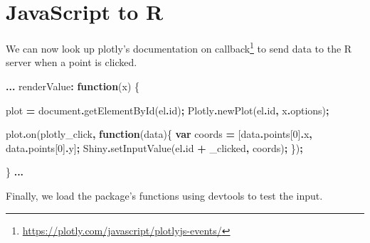 \documentclass[
]{krantz}
\makeatletter
\newenvironment{Shaded}{\begin{snugshade}}{\end{snugshade}}
\newcommand{\AttributeTok}[1]{\textcolor[rgb]{0.61,0.61,0.61}{#1}}
\newcommand{\BuiltInTok}[1]{#1}
\newcommand{\DecValTok}[1]{\textcolor[rgb]{0.06,0.06,0.06}{#1}}
\newcommand{\FunctionTok}[1]{\textcolor[rgb]{0,0,0}{#1}}
\newcommand{\KeywordTok}[1]{\textcolor[rgb]{0.27,0.27,0.27}{\textbf{#1}}}
\newcommand{\NormalTok}[1]{#1}
\newcommand{\OperatorTok}[1]{\textcolor[rgb]{0.43,0.43,0.43}{\textbf{#1}}}
\newcommand{\StringTok}[1]{\textcolor[rgb]{0.5,0.5,0.5}{#1}}
\renewcommand{\href}[2]{#2\footnote{\url{#1}}}
\newenvironment{kframe}{%
\medskip{}
\setlength{\fboxsep}{.8em}
 \def\at@end@of@kframe{}%
 \ifinner\ifhmode%
  \def\at@end@of@kframe{\end{minipage}}%
  \begin{minipage}{\columnwidth}%
 \fi\fi%
 \def\FrameCommand##1{\hskip\@totalleftmargin \hskip-\fboxsep
 \colorbox{shadecolor}{##1}\hskip-\fboxsep
     \hskip-\linewidth \hskip-\@totalleftmargin \hskip\columnwidth}%
 \MakeFramed {\advance\hsize-\width
   \@totalleftmargin\z@ \linewidth\hsize
   \@setminipage}}%
 {\par\unskip\endMakeFramed%
 \at@end@of@kframe}
\renewenvironment{Shaded}{\begin{kframe}}{\end{kframe}}
\makeatother
\begin{document}
\hypertarget{javascript-to-r-1}{%
\section*{JavaScript to R}\label{javascript-to-r-1}}


We can now look up plotly's documentation on \href{https://plotly.com/javascript/plotlyjs-events/}{callback} to send data to the R server when a point is clicked.

\begin{Shaded}
\begin{Highlighting}[]
\OperatorTok{...}
\NormalTok{renderValue}\OperatorTok{:} \KeywordTok{function}\NormalTok{(x) \{}

\NormalTok{  plot }\OperatorTok{=} \BuiltInTok{document}\OperatorTok{.}\FunctionTok{getElementById}\NormalTok{(el}\OperatorTok{.}\AttributeTok{id}\NormalTok{)}\OperatorTok{;}
\NormalTok{  Plotly}\OperatorTok{.}\FunctionTok{newPlot}\NormalTok{(el}\OperatorTok{.}\AttributeTok{id}\OperatorTok{,}\NormalTok{ x}\OperatorTok{.}\AttributeTok{options}\NormalTok{)}\OperatorTok{;}

\NormalTok{  plot}\OperatorTok{.}\FunctionTok{on}\NormalTok{(}\StringTok{\textquotesingle{}plotly\_click\textquotesingle{}}\OperatorTok{,} \KeywordTok{function}\NormalTok{(data)\{}
    \KeywordTok{var}\NormalTok{ coords }\OperatorTok{=}\NormalTok{ [data}\OperatorTok{.}\AttributeTok{points}\NormalTok{[}\DecValTok{0}\NormalTok{]}\OperatorTok{.}\AttributeTok{x}\OperatorTok{,}\NormalTok{ data}\OperatorTok{.}\AttributeTok{points}\NormalTok{[}\DecValTok{0}\NormalTok{]}\OperatorTok{.}\AttributeTok{y}\NormalTok{]}\OperatorTok{;}
\NormalTok{    Shiny}\OperatorTok{.}\FunctionTok{setInputValue}\NormalTok{(el}\OperatorTok{.}\AttributeTok{id} \OperatorTok{+} \StringTok{\textquotesingle{}\_clicked\textquotesingle{}}\OperatorTok{,}\NormalTok{ coords)}\OperatorTok{;}
\NormalTok{  \})}\OperatorTok{;}

\NormalTok{\}}
\OperatorTok{...}
\end{Highlighting}
\end{Shaded}

Finally, we load the package's functions using devtools to test the input.
\end{document}
